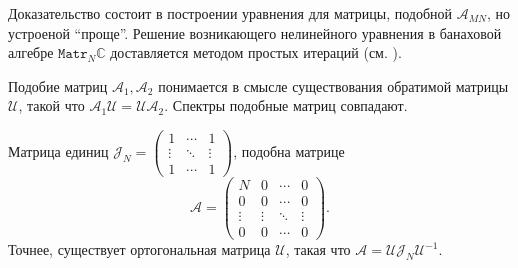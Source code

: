 Доказательство состоит в построении уравнения для матрицы, подобной \( \mathscr{A}_{MN} \),
 но устроеной ``проще''. Решение возникающего нелинейного уравнения
 в банаховой алгебре \( \mathtt{Matr}_N\mathbb{C} \)
 доставляется методом простых итераций (см. \cite{baskakov-harmonic}).

Подобие матриц \( \mathcal{A}_1, \mathcal{A}_2 \)
 понимается в смысле существования обратимой матрицы \( \mathcal{U} \),
 такой что \( \mathcal{A}_1 \mathcal{U} = \mathcal{U} \mathcal{A}_2 \).
Спектры подобные матриц совпадают.

\begin{lem}
    Матрица единиц 
    \( \mathcal{J}_N =
    \begin{pmatrix}
        1 & \cdots & 1 \\
        \vdots & \ddots & \vdots \\ 
    1 & \cdots & 1 \end{pmatrix} \),
    подобна матрице
    \[
        \mathcal{A} = \begin{pmatrix}
            N & 0 & \cdots & 0 \\
            0 & 0 & \cdots & 0 \\
            \vdots & \vdots & \ddots & \vdots \\
            0 & 0 & \cdots & 0 \end{pmatrix}. \]
    Точнее, существует ортогональная матрица \( \mathcal{U} \),
    такая что
    \( \mathcal{A} = \mathcal{U}\mathcal{J}_N \mathcal{U}^{-1} \).
\end{lem}
